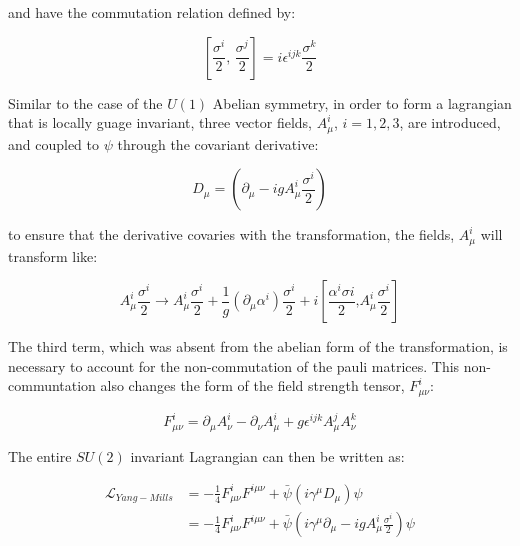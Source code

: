 \noindent and have the commutation relation defined by:

\begin{equation}\label{eq:pauli_matrices_commutator}
\left[\frac{\sigma^{i}}{2}\text{, }\frac{\sigma^{j}}{2}\right] =
i\epsilon^{ijk}\frac{\sigma^{k}}{2}
\end{equation}

\par Similar to the case of the $U(1)$ Abelian symmetry, in order to form
a lagrangian that is locally guage invariant, three vector fields,
$A_{\mu}^{i}$, $i=1,2,3$, are introduced, and coupled to $\psi$
through the covariant derivative:

\begin{equation}\label{eq:yang_mills_covariant_derivative}
D_{\mu} = (\partial_{\mu} - igA_{\mu}^{i}\frac{\sigma^{i}}{2})
\end{equation}

\noindent to ensure that the derivative covaries with the
transformation, the fields, $A_{\mu}^{i}$ will transform like:

\begin{equation}\label{eq:yang_mills_vector_field_transformation}
A_{\mu}^{i}\frac{\sigma^{i}}{2} \rightarrow
A_{\mu}^{i}\frac{\sigma^{i}}{2} +
\frac{1}{g}(\partial_{\mu}\alpha^{i})\frac{\sigma
^{i}}{2} +
i\left[\frac{\alpha^{i}\sigma{i}}{2}\text{,
}A_{\mu}^{i}\frac{\sigma^{i}}{2}\right]
\end{equation}

\noindent The third term, which was absent from the abelian form of
the transformation, is necessary to account for the non-commutation of
the pauli matrices.  This non-communtation also changes the form of
the field strength tensor, $F_{\mu\nu}^{i}$:

\begin{equation}\label{eq:yang_mills_field_strength_tensor}
F_{\mu\nu}^{i} = \partial_{\mu}A_{\nu}^{i} - \partial_{\nu}A_{\mu}^{i} + g\epsilon^{ijk}A_{\mu}^{j}A_{\nu}^{k}
\end{equation}

\noindent The entire $SU(2)$ invariant Lagrangian can then be written
as:

\begin{equation}\label{eq:yang_mills_invariant_lagrangian}
\begin{aligned}
\mathcal{L}_{Yang-Mills} & = -\frac{1}{4}F_{\mu\nu}^{i}F^{i\mu\nu} +
\bar{\psi}(i\gamma^{\mu}D_{\mu})\psi \\
 & = -\frac{1}{4}F_{\mu\nu}^{i}F^{i\mu\nu} +
\bar{\psi}(i\gamma^{\mu}\partial_{\mu} -
igA_{\mu}^{i}\frac{\sigma^{i}}{2})\psi
\end{aligned}
\end{equation}

